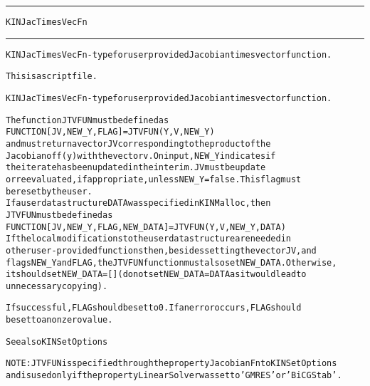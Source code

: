 \begin{samepage}
\hrule
\begin{center}
{\large \verb!KINJacTimesVecFn!}
\label{p:KINJacTimesVecFn}
\end{center}
\hrule\vspace{0.1in}



\begin{alltt}
KINJacTimesVecFn - type for user provided Jacobian times vector function.
\end{alltt}

\end{samepage}



\begin{samepage}


\begin{alltt}
This is a script file. 
\end{alltt}

\end{samepage}



\begin{alltt}
KINJacTimesVecFn - type for user provided Jacobian times vector function.

   The function JTVFUN must be defined as 
        FUNCTION [JV, NEW_Y, FLAG] = JTVFUN(Y, V, NEW_Y)
   and must return a vector JV corresponding to the product of the 
   Jacobian of f(y) with the vector v. On input, NEW_Y indicates if
   the iterate has been updated in the interim. JV must be update
   or reevaluated, if appropriate, unless NEW_Y=false. This flag must
   be reset by the user.
   If a user data structure DATA was specified in KINMalloc, then
   JTVFUN must be defined as
        FUNCTION [JV, NEW_Y, FLAG, NEW_DATA] = JTVFUN(Y, V, NEW_Y, DATA)
   If the local modifications to the user data structure are needed in
   other user-provided functions then, besides setting the vector JV, and
   flags NEW_Y and FLAG, the JTVFUN function must also set NEW_DATA. Otherwise, 
   it should set NEW_DATA=[] (do not set NEW_DATA = DATA as it would lead to
   unnecessary copying).

   If successful, FLAG should be set to 0. If an error occurs, FLAG should
   be set to a nonzero value.

   See also KINSetOptions

   NOTE: JTVFUN is specified through the property JacobianFn to KINSetOptions
   and is used only if the property LinearSolver was set to 'GMRES' or 'BiCGStab'.
\end{alltt}






\vspace{0.1in}
